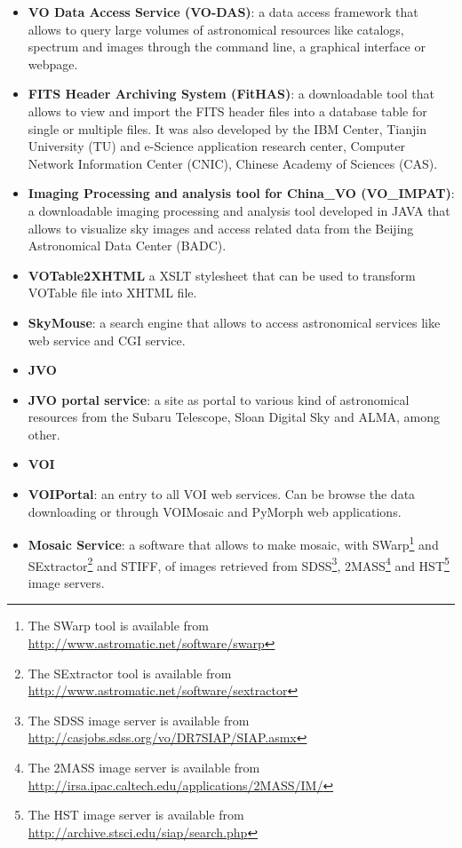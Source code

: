 \begin{itemize}
\item \textbf{VO Data Access Service (VO-DAS)}:
a data access framework that allows to query large volumes of astronomical
resources like catalogs, spectrum and images through the command line, a
graphical interface or webpage.

\item \textbf{FITS Header Archiving System (FitHAS)}:
a downloadable tool that allows to view and import the FITS header files into a
database table for single or multiple files. It was also developed by the IBM
Center, Tianjin University (TU) and e-Science application research center,
Computer Network Information Center (CNIC), Chinese Academy of Sciences (CAS).

\item \textbf{Imaging Processing and analysis tool for China\_VO (VO\_IMPAT)}:
a downloadable imaging processing and analysis tool developed in JAVA that
allows to visualize sky images and access related data from the Beijing
Astronomical Data Center (BADC). 

\item \textbf{VOTable2XHTML}
a XSLT stylesheet that can be used to transform VOTable file into XHTML file.

\item \textbf{SkyMouse}:
a search engine that allows to access astronomical services like web service and
CGI service.

\item \textbf{JVO}
\item \textbf{JVO portal service}:
a site as portal to various kind of astronomical resources from the Subaru
Telescope, Sloan Digital Sky and ALMA, among other.

\item \textbf{VOI}
\item \textbf{VOIPortal}:
an entry to all VOI web services. Can be browse the data downloading or through
VOIMosaic and PyMorph web applications.

\item \textbf{Mosaic Service}:
a software that allows to make mosaic, with SWarp\footnote{The SWarp tool is
available from \url{http://www.astromatic.net/software/swarp}} and
SExtractor\footnote{The SExtractor tool is available from
\url{http://www.astromatic.net/software/sextractor}} and STIFF, of images
retrieved from SDSS\footnote{The SDSS image server is available from
\url{http://casjobs.sdss.org/vo/DR7SIAP/SIAP.asmx}}, 2MASS\footnote{The 2MASS
image server is available from
\url{http://irsa.ipac.caltech.edu/applications/2MASS/IM/}} and HST\footnote{The
HST image server is available from
\url{http://archive.stsci.edu/siap/search.php}} image servers.


\end{itemize}
